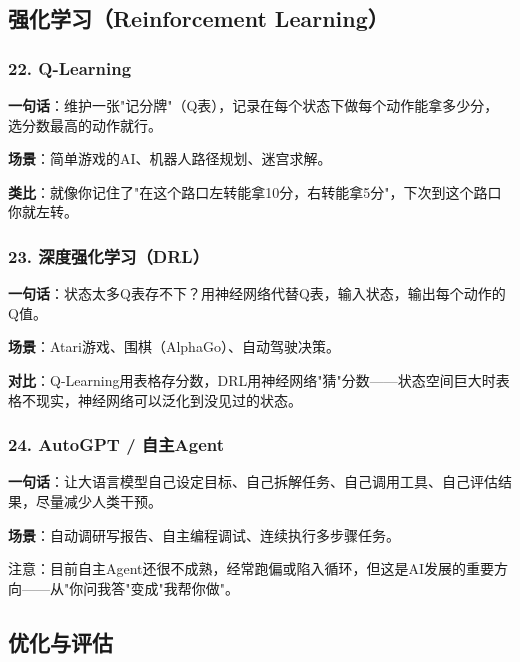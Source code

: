 \documentclass[12pt,a4paper]{ctexart}
\begin{document}
\subsection{强化学习（Reinforcement Learning）}

\subsubsection{22. Q-Learning}

\begin{funbox}[Q-Learning]
\textbf{一句话}：维护一张"记分牌"（Q表），记录在每个状态下做每个动作能拿多少分，选分数最高的动作就行。

\textbf{场景}：简单游戏的AI、机器人路径规划、迷宫求解。

\textbf{类比}：就像你记住了"在这个路口左转能拿10分，右转能拿5分"，下次到这个路口你就左转。
\end{funbox}

\subsubsection{23. 深度强化学习（DRL）}

\begin{funbox}[DRL]
\textbf{一句话}：状态太多Q表存不下？用神经网络代替Q表，输入状态，输出每个动作的Q值。

\textbf{场景}：Atari游戏、围棋（AlphaGo）、自动驾驶决策。

\textbf{对比}：Q-Learning用表格存分数，DRL用神经网络"猜"分数——状态空间巨大时表格不现实，神经网络可以泛化到没见过的状态。
\end{funbox}

\subsubsection{24. AutoGPT / 自主Agent}

\begin{funbox}[AutoGPT]
\textbf{一句话}：让大语言模型自己设定目标、自己拆解任务、自己调用工具、自己评估结果，尽量减少人类干预。

\textbf{场景}：自动调研写报告、自主编程调试、连续执行多步骤任务。

注意：目前自主Agent还很不成熟，经常跑偏或陷入循环，但这是AI发展的重要方向——从"你问我答"变成"我帮你做"。
\end{funbox}

\subsection{优化与评估}
\end{document}
